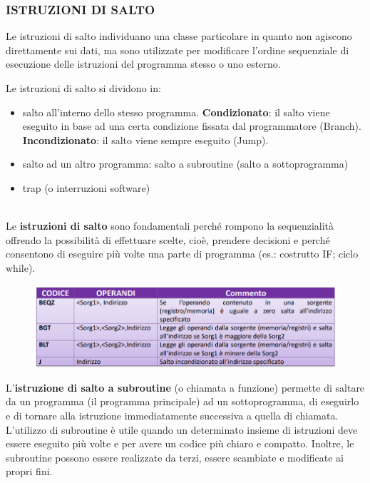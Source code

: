 \documentclass[12pt]{article}
\begin{document}
\subsubsection{ISTRUZIONI DI SALTO}
Le istruzioni di salto individuano una classe particolare in quanto non agiscono direttamente sui dati, ma sono utilizzate per modificare l’ordine sequenziale di esecuzione delle istruzioni del programma stesso o uno esterno. \par\medskip\noindent
Le istruzioni di salto si dividono in:
\begin{itemize}
    \item salto all’interno dello stesso programma.\textbf{ Condizionato}: il salto viene eseguito in base ad una certa condizione fissata dal programmatore (Branch).\textbf{ Incondizionato}: il salto viene sempre eseguito (Jump).
    \item salto ad un altro programma: salto a subroutine (salto a sottoprogramma) 
    \item trap (o interruzioni software)
\end{itemize}
\par\maketitle\noindent \\ 
Le \textbf{istruzioni di salto} sono fondamentali perché rompono la sequenzialità offrendo la possibilità di effettuare scelte, cioè, prendere decisioni e perché consentono di eseguire più volte una parte di programma (es.: costrutto IF; ciclo while).
\begin{figure}[h]
    \centering
    \includegraphics[width=1\linewidth]{salto.png}
\end{figure}
\newpage
\noindent L’\textbf{istruzione di salto a subroutine} (o chiamata a funzione) permette di saltare da un programma (il programma principale) ad un sottoprogramma, di eseguirlo e di tornare alla istruzione immediatamente successiva a quella di chiamata. L’utilizzo di subroutine è utile quando un determinato insieme di istruzioni deve essere eseguito più volte e per avere un codice più chiaro e compatto. Inoltre, le subroutine possono essere realizzate da terzi, essere scambiate e modificate ai propri fini.
\end{document}

